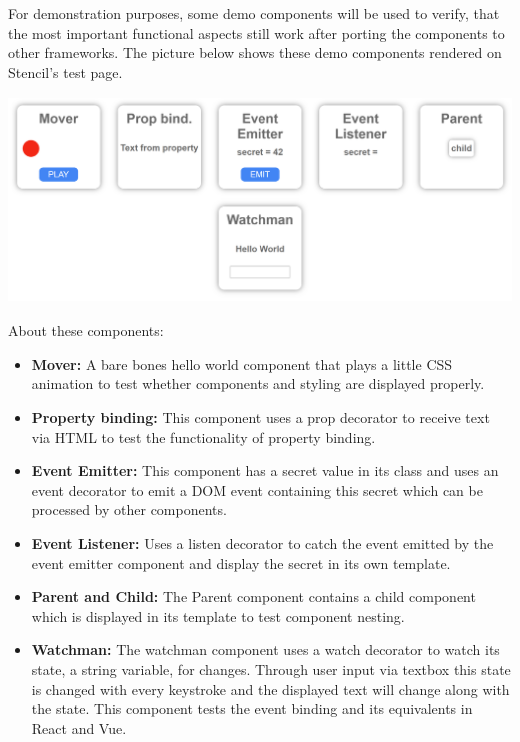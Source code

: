 For demonstration purposes, some demo components will be used to verify, that the most important functional aspects still work after porting the components to other frameworks. The picture below shows these demo components rendered on Stencil's test page. 
\includegraphics [height=6.2cm, width=15cm] {images/demopage}
About these components:
\begin{itemize}
	\item \textbf{Mover:} A bare bones hello world component that plays a little CSS animation to test whether components and styling are displayed properly.
	\item \textbf{Property binding:} This component uses a prop decorator to receive text via HTML to test the functionality of property binding.
	\item \textbf{Event Emitter:} This component has a secret value in its class and uses an event decorator to emit a DOM event containing this secret which can be processed by other components.
	\item \textbf{Event Listener:} Uses a listen decorator to catch the event emitted by the event emitter component and display the secret in its own template.
	\item \textbf{Parent and Child:} The Parent component contains a child component which is displayed in its template to test component nesting.
	\item \textbf{Watchman:} The watchman component uses a watch decorator to watch its state, a string variable, for changes. Through user input via textbox this state is changed with every keystroke and the displayed text will change along with the state. This component tests the event binding and its equivalents in React and Vue.
\end{itemize}

